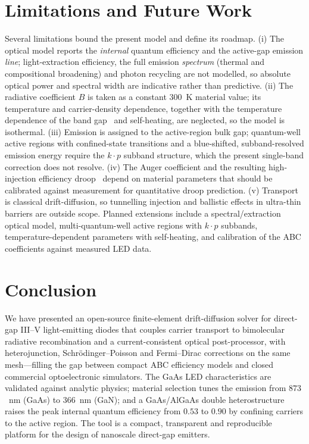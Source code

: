 \documentclass[conference]{IEEEtran}
\begin{document}
\section{Limitations and Future Work}
\label{sec:disc}
Several limitations bound the present model and define its roadmap. (i) The optical
model reports the \emph{internal} quantum efficiency and the active-gap emission
\emph{line}; light-extraction efficiency, the full emission \emph{spectrum}
(thermal and compositional broadening) and photon recycling are not modelled, so
absolute optical power and spectral width are indicative rather than
predictive. (ii) The radiative coefficient $B$ is taken as a constant $300$~K
material value; its temperature and carrier-density dependence, together with the
temperature dependence of the band gap~\cite{varshni} and self-heating, are
neglected, so the model is isothermal. (iii) Emission is assigned to the active-region bulk gap; quantum-well
active regions with confined-state transitions and a blue-shifted, subband-resolved
emission energy require the $k\!\cdot\!p$ subband structure, which the present
single-band correction does not resolve. (iv) The Auger coefficient and the
resulting high-injection efficiency droop~\cite{piprek_droop} depend on material
parameters that should be calibrated against measurement for quantitative droop
prediction. (v) Transport is classical drift-diffusion, so tunnelling injection
and ballistic effects in ultra-thin barriers are outside scope. Planned extensions
include a spectral/extraction optical model, multi-quantum-well active regions
with $k\!\cdot\!p$ subbands, temperature-dependent parameters with self-heating,
and calibration of the ABC coefficients against measured LED data.

\section{Conclusion}
We have presented an open-source finite-element drift-diffusion solver for
direct-gap III--V light-emitting diodes that couples carrier transport to
bimolecular radiative recombination and a current-consistent optical
post-processor, with heterojunction, Schr\"odinger--Poisson and Fermi--Dirac
corrections on the same mesh---filling the gap between compact ABC efficiency
models and closed commercial optoelectronic simulators. The GaAs LED
characteristics are validated against analytic physics; material selection tunes
the emission from $873$~nm (GaAs) to $366$~nm (GaN); and a GaAs/AlGaAs double
heterostructure raises the peak internal quantum efficiency from $0.53$ to $0.90$
by confining carriers to the active region. The tool is a compact, transparent and
reproducible platform for the design of nanoscale direct-gap emitters.
\end{document}
